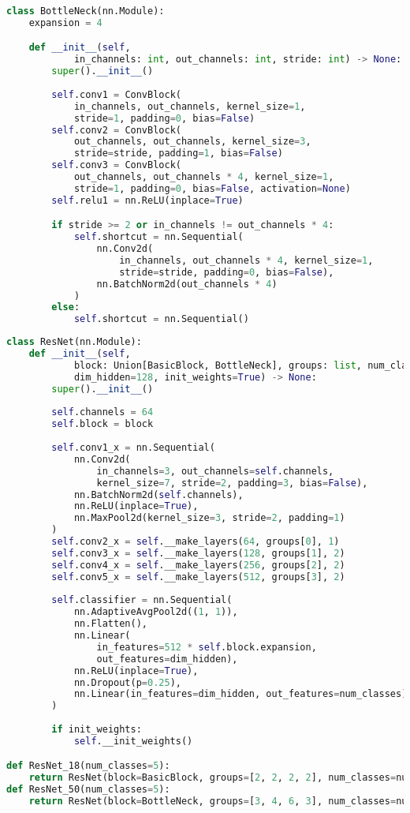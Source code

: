 \begin{lstlisting}[language=Python, caption={Python code of \textcolor{blue}{\textbf{BottleNeck}} (some code is omitted).}, label={bottleneck}]
class BottleNeck(nn.Module):
	expansion = 4

	def __init__(self, 
			in_channels: int, out_channels: int, stride: int) -> None:
		super().__init__()
		
		self.conv1 = ConvBlock(
			in_channels, out_channels, kernel_size=1, 
			stride=1, padding=0, bias=False)
		self.conv2 = ConvBlock(
			out_channels, out_channels, kernel_size=3, 
			stride=stride, padding=1, bias=False)
		self.conv3 = ConvBlock(
			out_channels, out_channels * 4, kernel_size=1, 
			stride=1, padding=0, bias=False, activation=None)
		self.relu1 = nn.ReLU(inplace=True)

		if stride >= 2 or in_channels != out_channels * 4:
			self.shortcut = nn.Sequential(
				nn.Conv2d(
					in_channels, out_channels * 4, kernel_size=1, 
					stride=stride, padding=0, bias=False),
				nn.BatchNorm2d(out_channels * 4)
			)
		else:
			self.shortcut = nn.Sequential()\end{lstlisting}

\begin{lstlisting}[language=Python, caption={Python code of \textcolor{blue}{\textbf{ResNet}} (some code is omitted).}, label={resnet}]
class ResNet(nn.Module):
    def __init__(self, 
            block: Union[BasicBlock, BottleNeck], groups: list, num_classes: int, 
            dim_hidden=128, init_weights=True) -> None:
        super().__init__()
        
        self.channels = 64
        self.block = block
        
        self.conv1_x = nn.Sequential(
            nn.Conv2d(
                in_channels=3, out_channels=self.channels, 
                kernel_size=7, stride=2, padding=3, bias=False), 
            nn.BatchNorm2d(self.channels), 
            nn.ReLU(inplace=True), 
            nn.MaxPool2d(kernel_size=3, stride=2, padding=1)
        )
        self.conv2_x = self.__make_layers(64, groups[0], 1)
        self.conv3_x = self.__make_layers(128, groups[1], 2)
        self.conv4_x = self.__make_layers(256, groups[2], 2)
        self.conv5_x = self.__make_layers(512, groups[3], 2)
        
        self.classifier = nn.Sequential(
            nn.AdaptiveAvgPool2d((1, 1)),
            nn.Flatten(),
            nn.Linear(
                in_features=512 * self.block.expansion, 
                out_features=dim_hidden),
            nn.ReLU(inplace=True),
            nn.Dropout(p=0.25),
            nn.Linear(in_features=dim_hidden, out_features=num_classes), 
        )
        
        if init_weights:
            self.__init_weights()

def ResNet_18(num_classes=5):
    return ResNet(block=BasicBlock, groups=[2, 2, 2, 2], num_classes=num_classes)
def ResNet_50(num_classes=5):
    return ResNet(block=BottleNeck, groups=[3, 4, 6, 3], num_classes=num_classes)\end{lstlisting}

